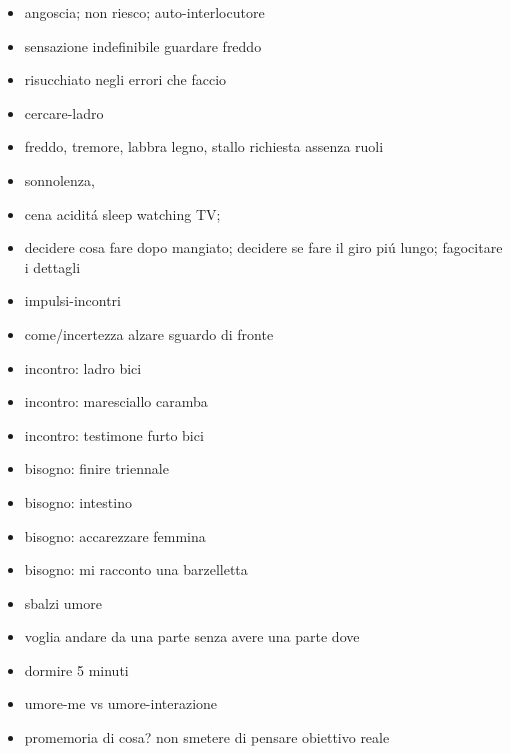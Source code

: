 \begin{itemize}
\item angoscia; non riesco; auto-interlocutore

\item sensazione indefinibile guardare freddo

\item risucchiato negli errori che faccio

\item cercare-ladro

\item freddo, tremore, labbra legno, stallo richiesta assenza ruoli

\item sonnolenza, 

\item cena acidit\'a sleep watching TV;

\item decidere cosa fare dopo mangiato; decidere se fare il giro pi\'u lungo; fagocitare i dettagli

\item impulsi-incontri

\item come/incertezza alzare sguardo di fronte

\item incontro: ladro bici

\item incontro: maresciallo caramba

\item incontro: testimone furto bici

\item bisogno: finire triennale

\item bisogno: intestino

\item bisogno: accarezzare femmina

\item bisogno: mi racconto una barzelletta

\item sbalzi umore

\item voglia andare da una parte senza avere una parte dove

\item dormire 5 minuti

\item umore-me vs umore-interazione

\item promemoria di cosa? non smetere di pensare obiettivo reale


\end{itemize}
